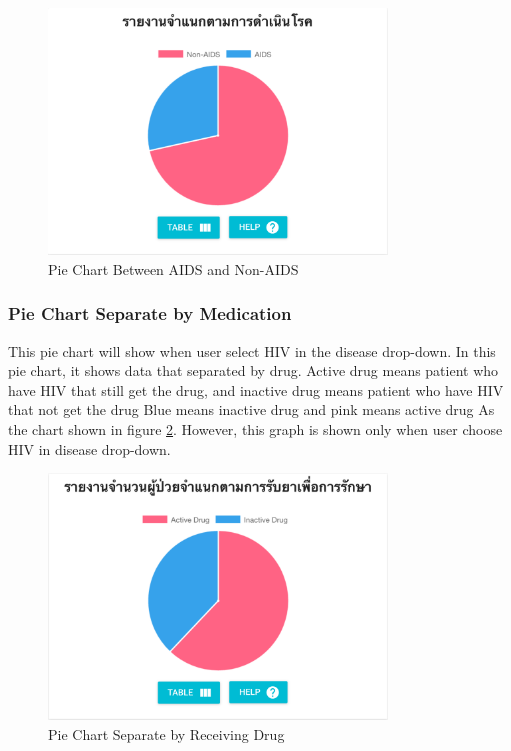     	\FloatBarrier
        	\begin{figure}[h!]
                \centering
            		\includegraphics[width=9cm]{images/chapter-05/pie-graph-seperate-disease.png}
            		\caption{Pie Chart Between AIDS and Non-AIDS}
            		\label{pie-graph-seperate-disease}
            \end{figure}
    	\FloatBarrier
	
	
	    \subsubsection{Pie Chart Separate by Medication}
	    
	        This pie chart will show when user select HIV in the disease drop-down. In this pie chart, it shows data that separated by drug. Active drug means patient who have HIV that still get the drug, and inactive drug means patient who have HIV that not get the drug
	        Blue means inactive drug and pink means active drug As the chart shown in figure \ref{pie-graph-receive-medicine}. However, this graph is shown only when user choose HIV in disease drop-down.
	        
           
        	\FloatBarrier
            	\begin{figure}[h!]
                    \centering
                		\includegraphics[width=9cm]{images/chapter-05/pie-graph-receive-medicine.png}
                		\caption{Pie Chart Separate by Receiving Drug}
                		\label{pie-graph-receive-medicine}
                \end{figure}
        	\FloatBarrier
	
